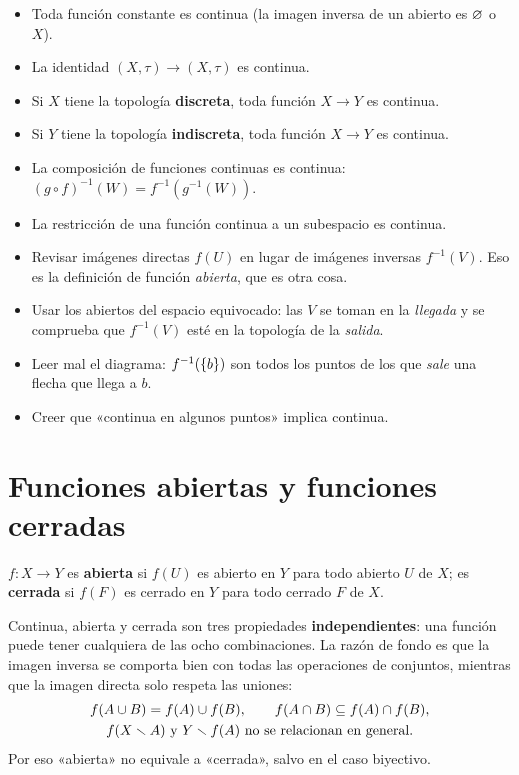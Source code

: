 \begin{ejemplo}
\begin{itemize}
\item Toda función constante es continua (la imagen inversa de un abierto es $\varnothing$ o $X$).
\item La identidad $(X,\tau)\to(X,\tau)$ es continua.
\item Si $X$ tiene la topología \textbf{discreta}, toda función $X\to Y$ es continua.
\item Si $Y$ tiene la topología \textbf{indiscreta}, toda función $X\to Y$ es continua.
\item La composición de funciones continuas es continua: $(g\circ f)^{-1}(W)=f^{-1}(g^{-1}(W))$.
\item La restricción de una función continua a un subespacio es continua.
\end{itemize}
\end{ejemplo}

\begin{ojo}
\begin{itemize}
\item Revisar imágenes directas $f(U)$ en lugar de imágenes inversas $f^{-1}(V)$. Eso es la definición de función
\emph{abierta}, que es otra cosa.
\item Usar los abiertos del espacio equivocado: las $V$ se toman en la \emph{llegada} y se comprueba que $f^{-1}(V)$
esté en la topología de la \emph{salida}.
\item Leer mal el diagrama: $f^{-1}(\{b\})$ son todos los puntos de los que \emph{sale} una flecha que llega a $b$.
\item Creer que «continua en algunos puntos» implica continua.
\end{itemize}
\end{ojo}

\section{Funciones abiertas y funciones cerradas}
\begin{definicion}[Definición]
$f:X\to Y$ es \textbf{abierta} si $f(U)$ es abierto en $Y$ para todo abierto $U$ de $X$; es \textbf{cerrada} si
$f(F)$ es cerrado en $Y$ para todo cerrado $F$ de $X$.
\end{definicion}
Continua, abierta y cerrada son tres propiedades \textbf{independientes}: una función puede tener cualquiera de las
ocho combinaciones. La razón de fondo es que la imagen inversa se comporta bien con todas las operaciones de conjuntos,
mientras que la imagen directa solo respeta las uniones:
\begin{gather*}
f(A\cup B)=f(A)\cup f(B),\qquad f(A\cap B)\subseteq f(A)\cap f(B),\\
f(X\smallsetminus A)\ \text{y}\ Y\smallsetminus f(A)\ \text{no se relacionan en general}.
\end{gather*}
Por eso «abierta» no equivale a «cerrada», salvo en el caso biyectivo.

